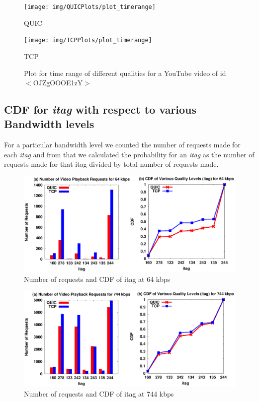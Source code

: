 \begin{figure}[!ht] 
\centering
\begin{minipage}{0.45\linewidth}
\texttt{[image: img/QUICPlots/plot\_timerange]} 
\caption{QUIC}
\label{fig:rseg1Q}
\end{minipage}
\begin{minipage}{0.45\linewidth}
\texttt{[image: img/TCPPlots/plot\_timerange]}
\caption{TCP}
\label{fig:rsegr1T}
\end{minipage} 
\caption{Plot for time range of different qualities for a YouTube video of id $<$OJZgOOOE1zY$>$}
\label{fig:rserr1}
\end{figure}



\subsection{CDF for \textit{itag} with respect to various Bandwidth levels}
For a particular bandwidth level we counted the number of requests made for each \textit{itag} and from that we calculated the probability for an  \textit{itag} as the number of requests made for that itag divided by total number of requests made.


\begin{figure}[!ht]
    \centering
    \includegraphics[width=\linewidth]{img/CDF/plot_itag_65536}
    \caption{Number of requests and CDF of itag at 64 kbps}
    \label{fig:itag6556}
\end{figure}

\begin{figure}[!ht]
    \centering
    \includegraphics[width=\linewidth]{img/CDF/plot_itag_761856}
    \caption{Number of requests and CDF of itag at 744 kbps}
    \label{fig:itag761}
\end{figure}

